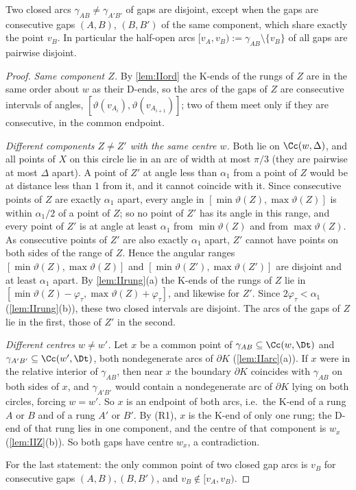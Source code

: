 \begin{lemma}\label{lem:IIdisj}
Two closed arcs $\gamma_{AB}\neq\gamma_{A'B'}$ of gaps are disjoint, except when the gaps are consecutive gaps $(A,B)$, $(B,B')$ of the same component, which share exactly the point $v_B$. In particular the half-open arcs $[v_A,v_B):=\gamma_{AB}\setminus\{v_B\}$ of all gaps are pairwise disjoint.
\end{lemma}
\begin{proof}
\emph{Same component $Z$.} By \cref{lem:IIord} the K-ends of the rungs of $Z$ are in the same order about $w$ as their D-ends, so the arcs of the gaps of $Z$ are consecutive intervals of angles, $[\vartheta(v_{A_i}),\vartheta(v_{A_{i+1}})]$; two of them meet only if they are consecutive, in the common endpoint.

\emph{Different components $Z\neq Z'$ with the same centre $w$.} Both lie on $\Cc(w,\Delta)$, and all points of $X$ on this circle lie in an arc of width at most $\pi/3$ (they are pairwise at most $\Delta$ apart). A point of $Z'$ at angle less than $\alpha_1$ from a point of $Z$ would be at distance less than $1$ from it, and it cannot coincide with it. Since consecutive points of $Z$ are exactly $\alpha_1$ apart, every angle in $[\min\vartheta(Z),\max\vartheta(Z)]$ is within $\alpha_1/2$ of a point of $Z$; so no point of $Z'$ has its angle in this range, and every point of $Z'$ is at angle at least $\alpha_1$ from $\min\vartheta(Z)$ and from $\max\vartheta(Z)$. As consecutive points of $Z'$ are also exactly $\alpha_1$ apart, $Z'$ cannot have points on both sides of the range of $Z$. Hence the angular ranges $[\min\vartheta(Z),\max\vartheta(Z)]$ and $[\min\vartheta(Z'),\max\vartheta(Z')]$ are disjoint and at least $\alpha_1$ apart. By \cref{lem:IIrung}(a) the K-ends of the rungs of $Z$ lie in $[\min\vartheta(Z)-\varphi_\tau,\max\vartheta(Z)+\varphi_\tau]$, and likewise for $Z'$. Since $2\varphi_\tau<\alpha_1$ (\cref{lem:IIrung}(b)), these two closed intervals are disjoint. The arcs of the gaps of $Z$ lie in the first, those of $Z'$ in the second.

\emph{Different centres $w\neq w'$.} Let $x$ be a common point of $\gamma_{AB}\subseteq\Cc(w,\Dt)$ and $\gamma_{A'B'}\subseteq\Cc(w',\Dt)$, both nondegenerate arcs of $\partial K$ (\cref{lem:IIarc}(a)). If $x$ were in the relative interior of $\gamma_{AB}$, then near $x$ the boundary $\partial K$ coincides with $\gamma_{AB}$ on both sides of $x$, and $\gamma_{A'B'}$ would contain a nondegenerate arc of $\partial K$ lying on both circles, forcing $w=w'$. So $x$ is an endpoint of both arcs, i.e.\ the K-end of a rung $A$ or $B$ and of a rung $A'$ or $B'$. By (R1), $x$ is the K-end of only one rung; the D-end of that rung lies in one component, and the centre of that component is $w_x$ (\cref{lem:IIZ}(b)). So both gaps have centre $w_x$, a contradiction.

For the last statement: the only common point of two closed gap arcs is $v_B$ for consecutive gaps $(A,B),(B,B')$, and $v_B\notin[v_A,v_B)$.
\end{proof}

